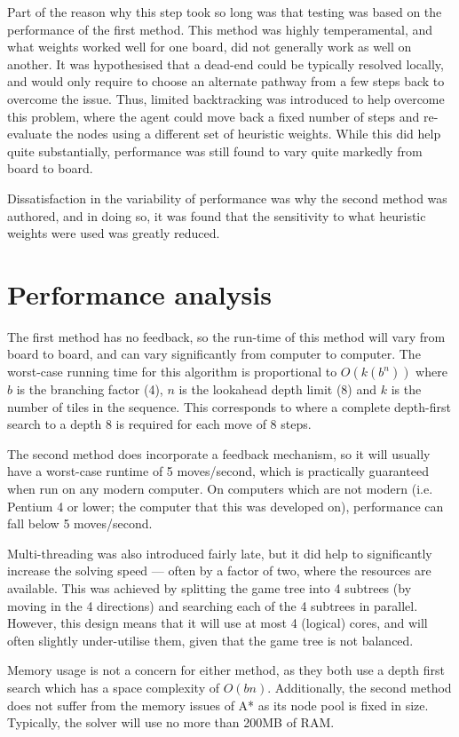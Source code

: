 \documentclass[a4paper, 11pt, titlepage]{report}
\begin{document}
Part of the reason why this step took so long was that testing was based on the performance of the first method. This method was highly temperamental, and what weights worked well for one board, did not generally work as well on another. It was hypothesised that a dead-end could be typically resolved locally, and would only require to choose an alternate pathway from a few steps back to overcome the issue. Thus, limited backtracking was introduced to help overcome this problem, where the agent could move back a fixed number of steps and re-evaluate the nodes using a different set of heuristic weights. While this did help quite substantially, performance was still found to vary quite markedly from board to board.

Dissatisfaction in the variability of performance was why the second method was authored, and in doing so, it was found that the sensitivity to what heuristic weights were used was greatly reduced.

\section{Performance analysis}
The first method has no feedback, so the run-time of this method will vary from board to board, and can vary significantly from computer to computer. The worst-case running time for this algorithm is proportional to $O(k(b^n))$ where $b$ is the branching factor (4), $n$ is the lookahead depth limit (8) and $k$ is the number of tiles in the sequence. This corresponds to where a complete depth-first search to a depth 8 is required for each move of 8 steps.

The second method does incorporate a feedback mechanism, so it will usually have a worst-case runtime of 5 moves/second, which is practically guaranteed when run on any modern computer. On computers which are not modern (i.e. Pentium 4 or lower; the computer that this was developed on), performance can fall below 5 moves/second.

Multi-threading was also introduced fairly late, but it did help to significantly increase the solving speed --- often by a factor of two, where the resources are available. This was achieved by splitting the game tree into 4 subtrees (by moving in the 4 directions) and searching each of the 4 subtrees in parallel. However, this design means that it will use at most 4 (logical) cores, and will often slightly under-utilise them, given that the game tree is not balanced.

Memory usage is not a concern for either method, as they both use a depth first search which has a space complexity of $O(bn)$. Additionally, the second method does not suffer from the memory issues of A* as its node pool is fixed in size. Typically, the solver will use no more than 200MB of RAM.
\end{document}
